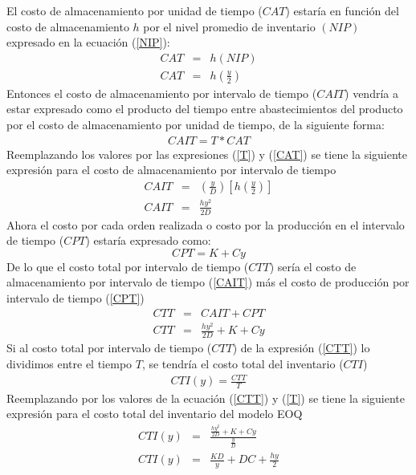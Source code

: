 El costo de almacenamiento por unidad de tiempo ($CAT$) estaría en función del costo de almacenamiento $h$ por el nivel promedio de inventario $(NIP)$ expresado en la ecuación (\ref{NIP}):
\begin{eqnarray}
	\label{CAT}
	CAT &=& h(NIP) \nonumber \\
	CAT &=& h\left(\frac{y}{2} \right)
\end{eqnarray}
Entonces el costo de almacenamiento por intervalo de tiempo ($CAIT$) vendría a estar expresado como el producto del tiempo entre abastecimientos del producto por el costo de almacenamiento por unidad de tiempo, de la siguiente forma:
\begin{eqnarray}
	CAIT = T * CAT \nonumber
\end{eqnarray}
Reemplazando los valores por las expresiones (\ref{T}) y (\ref{CAT}) se tiene la siguiente expresión para el costo de almacenamiento por intervalo de tiempo 
\begin{eqnarray}
	\label{CAIT}
	CAIT &=&  \left( \frac{y}{D} \right)  \left[ h \left( \frac{y}{2} \right) \right]  \nonumber \\
	CAIT &=& \frac{h {y}^{2}}{2D}
\end{eqnarray}
Ahora el costo por cada orden realizada o costo por la producción en el intervalo de tiempo ($CPT$) estaría expresado como:
\begin{equation}
	\label{CPT}
	CPT = K + Cy
\end{equation}
De lo que el costo total por intervalo de tiempo ($CTT$) sería el costo de almacenamiento por intervalo de tiempo (\ref{CAIT}) más el costo de producción por intervalo de tiempo (\ref{CPT})
\begin{eqnarray}
	\label{CTT}
	CTT &=& CAIT + CPT \nonumber \\
	CTT &=& \frac{h {y}^{2}}{2D} + K + Cy
\end{eqnarray}
Si al costo total por intervalo de tiempo ($CTT$) de la expresión (\ref{CTT}) lo dividimos entre el tiempo $T$, se tendría el costo total del inventario ($CTI$)
\begin{eqnarray}
	\label{CTIdejado}
	CTI(y) = \frac{CTT}{T} 
\end{eqnarray}
Reemplazando por los valores de la ecuación (\ref{CTT}) y (\ref{T}) se tiene la siguiente expresión para el costo total del inventario del modelo EOQ
\begin{eqnarray}
	\label{CTI}
	CTI(y) &=& \frac{\frac{h {y}^{2}}{2D} + K + Cy}{\frac{y}{D}} \nonumber \\
	CTI(y) &=& \frac{KD}{y} + DC + \frac{hy}{2}
\end{eqnarray}
